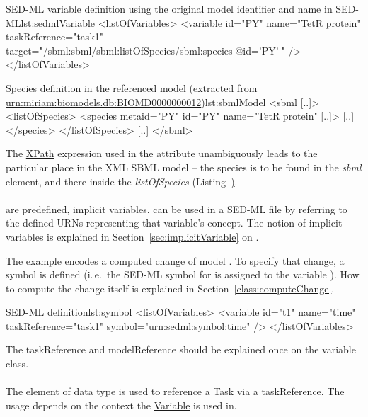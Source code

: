 \begin{myXmlLst}{SED-ML variable definition using the original model identifier and name in SED-ML}{lst:sedmlVariable}
<listOfVariables>
	<variable id="PY" name="TetR protein"  taskReference="task1" 
		target="/sbml:sbml/sbml:listOfSpecies/sbml:species[@id='PY']" />
</listOfVariables>
\end{myXmlLst}

\begin{myXmlLst}{Species definition in the referenced model (extracted from \url{urn:miriam:biomodels.db:BIOMD0000000012})}{lst:sbmlModel}
<sbml [..]>
	<listOfSpecies>
		<species metaid="PY" id="PY" name="TetR protein" [..]>
		[..]
		</species>
 	</listOfSpecies>
 	[..]
</sbml>
\end{myXmlLst}

The \hyperref[sec:xpath]{XPath} expression used in the  attribute unambiguously leads to the particular place in the XML SBML model -- the species is to be found in the \emph{sbml} element, and there inside the \emph{listOfSpecies} (Listing~\href{lst:sbmlModel}). 

\paragraph*{}
\label{sec:symbol}
 are predefined, implicit variables.  can be used in a SED-ML file by referring to the defined URNs representing that variable's concept. The notion of implicit variables is explained in Section~\ref{sec:implicitVariable} on .

The example encodes a computed change of model . To specify that change, a symbol is defined (i.\,e.\  the SED-ML symbol for  is assigned to the variable ). How to compute the change itself is explained in Section~\ref{class:computeChange}.

\begin{myXmlLst}{SED-ML  definition}{lst:symbol}
<listOfVariables>
	<variable id="t1" name="time" taskReference="task1" symbol="urn:sedml:symbol:time" />
</listOfVariables>
\end{myXmlLst}

The taskReference and modelReference should be explained once on the variable class.
\paragraph*{}
\label{sec:taskReferenceAttribute}
The  element of data type \hyperref[type:sidref]{} is used to reference a \hyperref[class:task]{Task} via a \hyperref[sec:taskReference]{taskReference}. The usage depends on the context the \hyperref[class:variable]{Variable} is used in.

